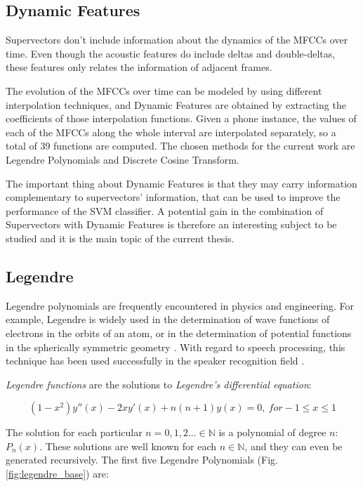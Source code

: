 \subsection{Dynamic Features}

Supervectors don't include information about the dynamics of the MFCCs over time. Even though
the acoustic features do include deltas and double-deltas, these features only relates the
information of adjacent frames.

The evolution of the MFCCs over time can be modeled by using different interpolation techniques,
and Dynamic Features are obtained by extracting the coefficients of those interpolation functions.
Given a phone instance,
the values of each of the MFCCs along the whole interval are
interpolated separately, so a total of 39 functions are computed.
The chosen methods for the current work are Legendre Polynomials and Discrete Cosine Transform.

The important thing about Dynamic Features is that they
may carry information complementary to supervectors' information, that can be used to improve
the performance of the SVM classifier. A potential gain in the combination
of Supervectors with Dynamic Features is therefore an interesting
subject to be studied and it is the main topic of the current thesis.

\subsection{Legendre}

Legendre polynomials are frequently encountered in physics and engineering.
For example, Legendre is widely used in the determination of wave
functions of electrons in the orbits of an atom, or in the determination of potential
functions in the spherically symmetric geometry \cite{legendre_usage}.
With regard to speech processing,
this technique has been used successfully
in the speaker recognition field \cite{legendre}.

\textit{Legendre functions} are the solutions to \textit{Legendre's differential equation}:

\begin{equation}
(1-x^{2})y''(x)-2xy'(x)+n(n+1)y(x)=0, \ for -1 \leq x \leq 1
\end{equation}

The solution for each particular $n={0, 1, 2 \dotsc} \in \mathbb{N}$ is a polynomial of degree
$n$: $P_{n}(x)$. These solutions are well known for each $n \in \mathbb{N}$, and they can even
be generated recursively. The first five Legendre Polynomials (Fig. \ref{fig:legendre_base}) are:

